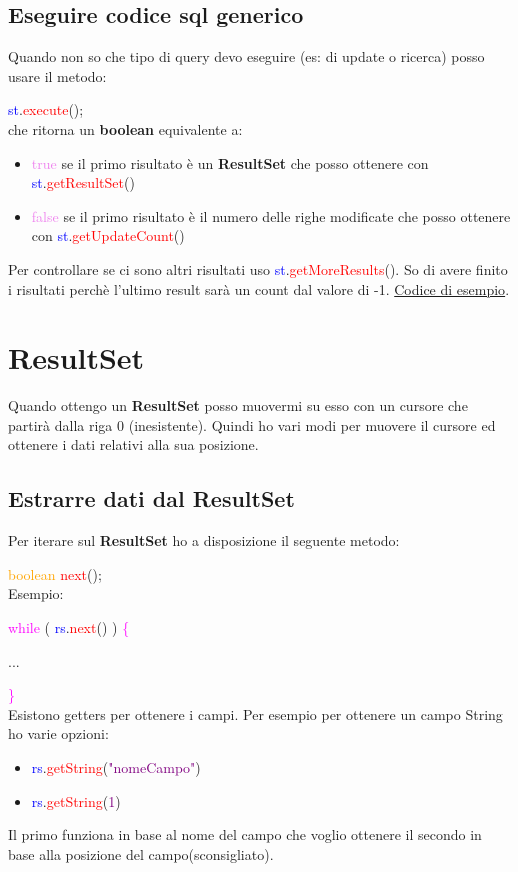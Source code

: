 \documentclass[11pt, letterpaper, titlepage]{article}
\begin{document}
\subsection{Eseguire codice sql generico}
Quando non so che tipo di query devo eseguire (es: di update o ricerca) posso usare il metodo:\par
\textcolor{blue}{st}.\textcolor{red}{execute}();\\
che ritorna un \textbf{boolean} equivalente a:
\begin{itemize}
    \item \textcolor{violet}{true} se il primo risultato è un \textbf{ResultSet} che posso ottenere
          con \textcolor{blue}{st}.\textcolor{red}{getResultSet}()
    \item \textcolor{violet}{false} se il primo risultato è il numero delle righe modificate che posso ottenere
          con \textcolor{blue}{st}.\textcolor{red}{getUpdateCount}()
\end{itemize}
Per controllare se ci sono altri risultati uso \textcolor{blue}{st}.\textcolor{red}{getMoreResults}().
So di avere finito i risultati perchè l'ultimo result sarà un count dal valore di -1.
\href{https://stackoverflow.com/questions/52700237/executequery-vs-getresultset-in-java#:~:text=boolean%20isResultSet%20%3D%20statement.execute(sql)%3B}{Codice di esempio}.

\section{ResultSet}
Quando ottengo un \textbf{ResultSet} posso muovermi su esso con un cursore che partirà dalla riga 0 (inesistente).
Quindi ho vari modi per muovere il cursore ed ottenere i dati relativi alla sua posizione.

\subsection{Estrarre dati dal ResultSet}
Per iterare sul \textbf{ResultSet} ho a disposizione il seguente metodo:\par
\textcolor{orange}{boolean} \textcolor{red}{next}();\\
Esempio:\par
\textcolor{magenta}{while} ( \textcolor{blue}{rs}.\textcolor{red}{next}() ) \textcolor{magenta}{\{}\par
...\par
\textcolor{magenta}{\}}\\
Esistono getters per ottenere i campi. Per esempio per ottenere un campo String ho varie
opzioni:
\begin{itemize}
    \item \textcolor{blue}{rs}.\textcolor{red}{getString}(\textcolor{purple}{"nomeCampo"})
    \item \textcolor{blue}{rs}.\textcolor{red}{getString}(\textcolor{purple}{1})
\end{itemize}
Il primo funziona in base al nome del campo che voglio ottenere il secondo in base alla
posizione del campo(sconsigliato).
\end{document}
